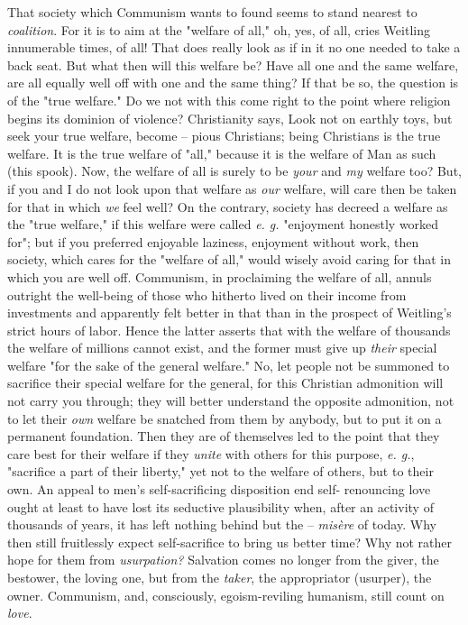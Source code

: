 That society which Communism wants to found seems to stand nearest to 
\textit{coalition}. For it is to aim at the "{}welfare of all,"{} oh, yes, of 
all, cries Weitling innumerable times, of all! That does really look as if in 
it no one needed to take a back seat. But what then will this welfare be? Have 
all one and the same welfare, are all equally well off with one and the same 
thing? If that be so, the question is of the "{}true welfare."{} Do we not 
with this come right to the point where religion begins its dominion of 
violence? Christianity says, Look not on earthly toys, but seek your true 
welfare, become -- pious Christians; being Christians is the true welfare. It 
is the true welfare of "{}all,"{} because it is the welfare of Man as such 
(this spook). Now, the welfare of all is surely to be \textit{your} and 
\textit{my} welfare too? But, if you and I do not look upon that welfare as 
\textit{our} welfare, will care then be taken for that in which \textit{we} 
feel well? On the contrary, society has decreed a welfare as the "{}true 
welfare,"{} if this welfare were called \textit{e. g.} "{}enjoyment honestly 
worked for"{}; but if you preferred enjoyable laziness, enjoyment without 
work, then society, which cares for the "{}welfare of all,"{} would wisely 
avoid caring for that in which you are well off. Communism, in proclaiming the 
welfare of all, annuls outright the well-being of those who hitherto lived on 
their income from investments and apparently felt better in that than in the 
prospect of Weitling's strict hours of labor. Hence the latter asserts that 
with the welfare of thousands the welfare of millions cannot exist, and the 
former must give up \textit{their} special welfare "{}for the sake of the 
general welfare."{} No, let people not be summoned to sacrifice their special 
welfare for the general, for this Christian admonition will not carry you 
through; they will better understand the opposite admonition, not to let their 
\textit{own} welfare be snatched from them by anybody, but to put it on a 
permanent foundation. Then they are of themselves led to the point that they 
care best for their welfare if they \textit{unite} with others for this 
purpose, \textit{e. g.}, "{}sacrifice a part of their liberty,"{} yet not to 
the welfare of others, but to their own. An appeal to men's self-sacrificing 
disposition end self- renouncing love ought at least to have lost its 
seductive plausibility when, after an activity of thousands of years, it has 
left nothing behind but the -- \textit{mis\`ere} of today. Why then still 
fruitlessly expect self-sacrifice to bring us better time? Why not rather hope 
for them from \textit{usurpation?} Salvation comes no longer from the giver, 
the bestower, the loving one, but from the \textit{taker}, the appropriator 
(usurper), the owner. Communism, and, consciously, egoism-reviling humanism, 
still count on \textit{love}.

